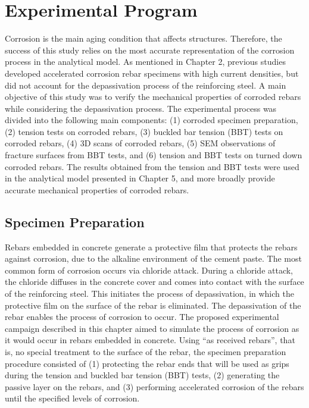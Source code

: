 \chapter{Experimental Program}
\label{chap-three}

Corrosion is the main aging condition that affects structures. Therefore, the success of this study relies on the most accurate representation of the corrosion process in the analytical model. As mentioned in Chapter 2, previous studies developed accelerated corrosion rebar specimens with high current densities, but did not account for the depassivation process of the reinforcing steel. A main objective of this study was to verify the mechanical properties of corroded rebars while considering the depassivation process. The experimental process was divided into the following main components: (1) corroded specimen preparation, (2) tension tests on corroded rebars, (3)	buckled bar tension (BBT) tests on corroded rebars, (4) 3D scans of corroded rebars, (5) SEM observations of fracture surfaces from BBT tests, and (6) tension  and  BBT  tests  on turned down corroded rebars. The results obtained from the tension and BBT tests were used     in the analytical model presented in Chapter 5, and more broadly provide accurate mechanical properties of corroded rebars.


\section{Specimen Preparation}

Rebars embedded in concrete generate a protective film that protects the rebars against corrosion, due to the alkaline environment of the cement paste. The most common form of corrosion occurs via chloride attack. During a chloride attack, the chloride diffuses in the concrete cover and comes into contact with the surface of the reinforcing steel. This initiates the process of depassivation, in which the protective film on the surface of the rebar is eliminated. The depassivation     of the rebar enables the process of corrosion to occur. The proposed experimental campaign described in this chapter aimed to simulate the process of corrosion as it would occur in rebars embedded in concrete. Using “as received rebars”, that is, no special treatment to the surface of the rebar, the specimen preparation procedure consisted of (1) protecting the rebar ends that will be used as grips during the tension and buckled bar tension (BBT) tests, (2) generating the passive layer on the rebars, and (3) performing accelerated corrosion of the rebars until the specified levels of corrosion.

